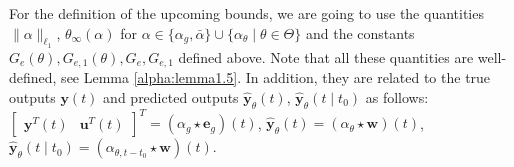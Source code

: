 \documentclass{article}
\def\rvu{{\mathbf{i}}}
\def\rvu{{\mathbf{u}}}
\def\rvw{{\mathbf{w}}}
\def\rvy{{\mathbf{y}}}
\newtheorem{lemma}[theorem]{Lemma}
\newcommand{\e}{\mathbf{e}}
\begin{document}
For the definition of the upcoming bounds, we are going to use the quantities
$\|\alpha\|_{\ell_1}$, $\theta_{\infty}(\alpha)$ for 
$\alpha \in  \{\alpha_g, \bar{\alpha}\} \cup \{\alpha_\theta \mid \theta \in \Theta\}$ and
the constants $G_e(\theta), G_{e,1}(\theta), G_e, G_{e,1}$ defined above. 
Note that all these quantities are well-defined, see Lemma \ref{alpha:lemma1.5}. In addition, they are related to 
 the true outputs $\rvy(t)$ and predicted outputs $\hat{\rvy}_\theta(t)$, $\hat{\rvy}_\theta(t \mid t_0)$ as follows:
 $\begin{bmatrix}\rvy^T(t) &  \rvu^T(t)\end{bmatrix}^T=(\alpha_{g} \star \e_g)(t)$,
 $\hat{\rvy}_{\theta}(t)=(\alpha_{\theta} \star \rvw)(t)$, 
 $\hat{\rvy}_{\theta}(t \mid t_0)=(\alpha_{\theta, t-t_0} \star \rvw)(t)$.
\end{document}
